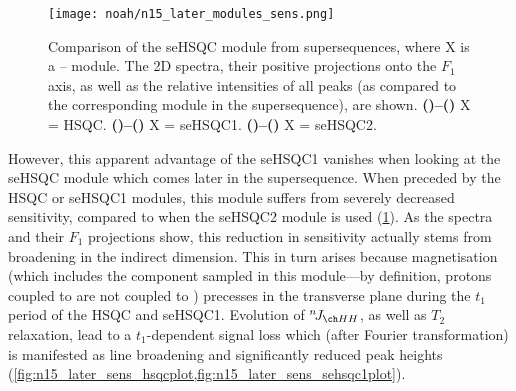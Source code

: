 \begin{figure}[!ht]
    \centering
    \texttt{[image: noah/n15\_later\_modules\_sens.png]}%
    {\label{fig:n15_later_sens_hsqc}}%
    {\label{fig:n15_later_sens_hsqcp}}%
    {\label{fig:n15_later_sens_hsqcplot}}%
    {\label{fig:n15_later_sens_sehsqc1}}%
    {\label{fig:n15_later_sens_sehsqc1p}}%
    {\label{fig:n15_later_sens_sehsqc1plot}}%
    {\label{fig:n15_later_sens_sehsqc2}}%
    {\label{fig:n15_later_sens_sehsqc2p}}%
    {\label{fig:n15_later_sens_sehsqc2plot}}%
    \caption[Comparison of \carbon{} seHSQC sensitivity when preceded by different \nitrogen{} modules]{
        Comparison of the \carbon{} seHSQC module from  supersequences, where X is a \proton{}--\nitrogen{} module.
        The 2D spectra, their positive projections onto the $F_1$ axis, as well as the relative intensities of all peaks (as compared to the corresponding module in the  supersequence), are shown.
        \textbf{()--()} X = \nitrogen{} HSQC.
        \textbf{()--()} X = \nitrogen{} seHSQC1.
        \textbf{()--()} X = \nitrogen{} seHSQC2.
    }
    \label{fig:n15_later_sens}
\end{figure}

However, this apparent advantage of the seHSQC1 vanishes when looking at the \carbon{} seHSQC module which comes later in the supersequence.
When preceded by the \nitrogen{} HSQC or seHSQC1 modules, this module suffers from severely decreased sensitivity, compared to when the seHSQC2 module is used (\cref{fig:n15_later_sens}).
As the spectra and their $F_1$ projections show, this reduction in sensitivity actually stems from broadening in the indirect dimension.
This in turn arises because  magnetisation (which includes the  component sampled in this module---by definition, protons coupled to \carbon{} are not coupled to \nitrogen{}) precesses in the transverse plane during the $t_1$ period of the \nitrogen{} HSQC and seHSQC1.
Evolution of $\nJ{HH}$, as well as $T_2$ relaxation, lead to a $t_1$-dependent signal loss which (after Fourier transformation) is manifested as line broadening and significantly reduced peak heights (\cref{fig:n15_later_sens_hsqcplot,fig:n15_later_sens_sehsqc1plot}).

